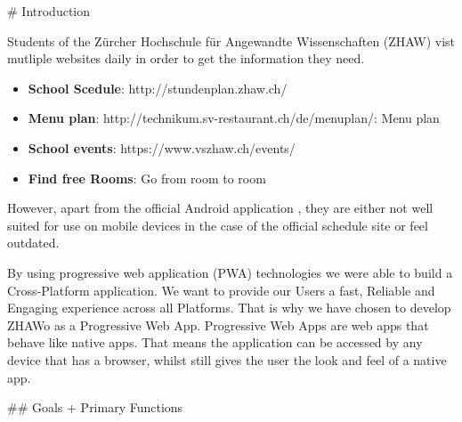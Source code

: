 \begin{markdown}

# Introduction

Students of the Zürcher Hochschule für Angewandte Wissenschaften (ZHAW) vist mutliple websites daily in order to get the information they need.

\begin{itemize}
  \item \textbf{School Scedule}: http://stundenplan.zhaw.ch/
  \item \textbf{Menu plan}: http://technikum.sv-restaurant.ch/de/menuplan/: Menu plan
  \item \textbf{School events}: https://www.vszhaw.ch/events/
  \item \textbf{Find free Rooms}: Go from room to room
\end{itemize}


However, apart from the official Android application \cite{DUMMY}, they are either not well suited for use on mobile devices in the case of the official schedule site \cite{DUMMY} or feel outdated.



By using progressive web application (PWA) technologies \cite{OurReadme} we were able to build a Cross-Platform application.
We want to provide our Users a fast, Reliable and Engaging experience across all Platforms. That is why we have chosen to develop ZHAWo as a Progressive Web App. Progressive Web Apps are web apps that behave like native apps. That means the application can be accessed by any device that has a browser, whilst still gives the user the look and feel of a native app.



## Goals + Primary Functions


\end{markdown}
